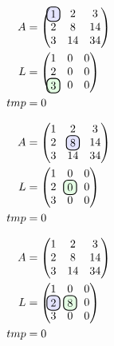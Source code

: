 \documentclass[aspectratio=169,hyperref={pdfpagelabels=false}]{beamer}
\begin{document}
\begin{frame}
    \begin{align*}
        A &= \begin{pmatrix}
            \hlight{1} &  2 & 3\\
            2 &  8 & 14\\
            3 & 14 & 34
        \end{pmatrix}\\
        L &= \begin{pmatrix}
            1 & 0 & 0\\
            2 & 0 & 0\\
            \tocalculate{3} & 0 & 0
        \end{pmatrix}\\
        tmp &= 0
    \end{align*}
\end{frame}

\begin{frame}
    \begin{align*}
        A &= \begin{pmatrix}
            1 &  2 & 3\\
            2 &  \hlight{8} & 14\\
            3 & 14 & 34
        \end{pmatrix}\\
        L &= \begin{pmatrix}
            1 & 0 & 0\\
            2 & \tocalculate{0} & 0\\
            3 & 0 & 0
        \end{pmatrix}\\
        tmp &= 0
    \end{align*}
\end{frame}

\begin{frame}
    \begin{align*}
        A &= \begin{pmatrix}
            1 &  2 & 3\\
            2 &  8 & 14\\
            3 & 14 & 34
        \end{pmatrix}\\
        L &= \begin{pmatrix}
            1 & 0 & 0\\
            \hlight{2} & \tocalculate{8} & 0\\
            3 & 0 & 0
        \end{pmatrix}\\
        tmp &= 0
    \end{align*}
\end{frame}
\end{document}
